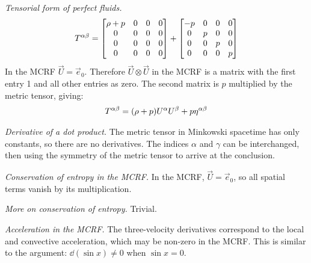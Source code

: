 \documentclass{report}
\begin{document}
\begin{subquests}
	\item \emph{Tensorial form of perfect fluids.}
	\begin{gather*}
		T^{\alpha\beta} = 
		\mqty[
			\rho + p & 0 & 0 & 0 \\
		 	0 & 0 & 0 & 0 \\
		 	0 & 0 & 0 & 0 \\
		 	0 & 0 & 0 & 0
		 	]
		+
		\mqty[
			-p & 0 & 0 & 0 \\
			0 & p & 0 & 0 \\
			0 & 0 & p & 0 \\
			0 & 0 & 0 & p
			]
	\end{gather*}
	In the MCRF $\vec{U} = \vec{e}_0$. Therefore $\vec U \otimes \vec U$ in the MCRF is a matrix with the first entry 1 and all other entries as zero. The second matrix is $p$ multiplied by the metric tensor, giving:
	\begin{gather*}
		T^{\alpha\beta} = \pqty{\rho + p}U^{\alpha}U^{\beta} + p\eta^{\alpha\beta}
	\end{gather*}

	\item \emph{Derivative of a dot product.}
	The metric tensor in Minkowski spacetime has only constants, so there are no derivatives. The indices $\alpha$ and $\gamma$ can be interchanged, then using the symmetry of the metric tensor to arrive at the conclusion.

	\item \emph{Conservation of entropy in the MCRF.}
	In the MCRF, $\vec{U} = \vec{e}_0$, so all spatial terms vanish by its multiplication.

	\item \emph{More on conservation of entropy.}
	Trivial.

	\item \emph{Acceleration in the MCRF.}
	The three-velocity derivatives correspond to the local and convective acceleration, which may be non-zero in the MCRF. This is similar to the argument: $\dd(\sin x) \neq 0$ when $\sin x = 0$.


\end{subquests}
\end{document}
